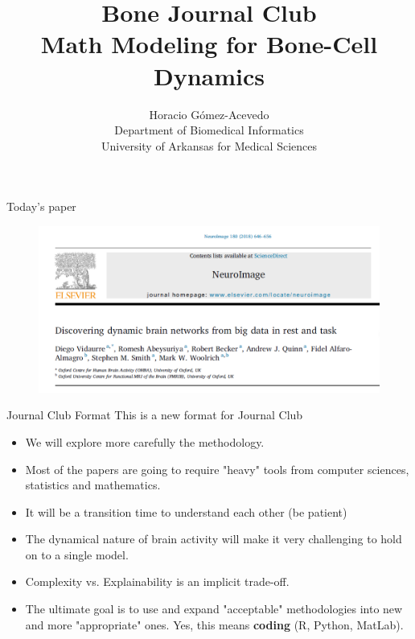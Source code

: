 \documentclass{beamer}
\title{Bone Journal Club\\ Math Modeling for Bone-Cell Dynamics}
\author{Horacio G\'omez-Acevedo\\ Department of Biomedical Informatics\\
	University of Arkansas for Medical Sciences}
\begin{document}
	\begin{frame}[plain]
		\maketitle
	\end{frame}
	
\begin{frame}{Today's paper}
	\begin{figure}[h]
	\centering
		\includegraphics[scale=0.6]{../Figures/vidaurre_paper.png}
	\end{figure}
\end{frame}

\begin{frame}{Journal Club Format}
	This is a new format for Journal Club
	\begin{itemize}
		\item We will explore more carefully the methodology.
		\item Most of the papers are going to require "heavy" tools from computer sciences, statistics and mathematics. 
		\item It will be a transition time to understand each other (be patient)
		\item The dynamical nature of brain activity will make it very challenging to hold on to a single model. 
		\item Complexity vs. Explainability is an implicit trade-off. 
		\item The ultimate goal is to use and expand "acceptable" methodologies into new and more "appropriate" ones. Yes, this means \textbf{coding} (R, Python, MatLab).
	\end{itemize} 
\end{frame}
\end{document}
